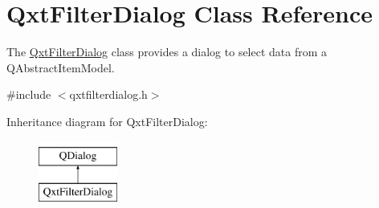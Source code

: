 \hypertarget{class_qxt_filter_dialog}{\section{Qxt\-Filter\-Dialog Class Reference}
\label{class_qxt_filter_dialog}
}


The \hyperlink{class_qxt_filter_dialog}{Qxt\-Filter\-Dialog} class provides a dialog to select data from a Q\-Abstract\-Item\-Model.  




{\ttfamily \#include $<$qxtfilterdialog.\-h$>$}

Inheritance diagram for Qxt\-Filter\-Dialog\-:\begin{figure}[H]
\begin{center}
\leavevmode
\includegraphics[height=2.000000cm]{class_qxt_filter_dialog}
\end{center}
\end{figure}
